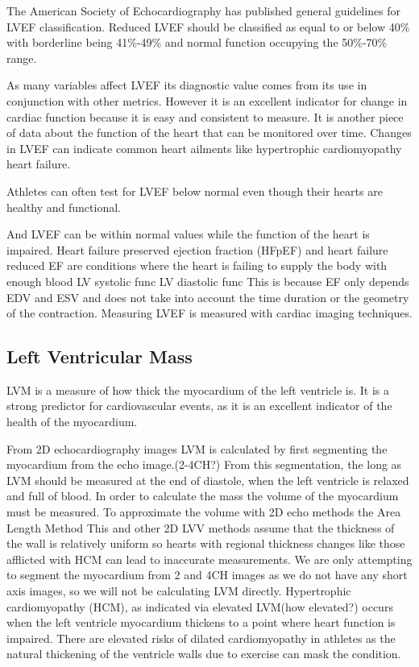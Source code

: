 \documentclass[12pt]{article}
\begin{document}
The American Society of Echocardiography has published general guidelines for LVEF classification.
Reduced LVEF should be classified as equal to or below 40\% with
borderline being 41\%-49\%
and normal function occupying the 50\%-70\% range.\cite{}

As many variables affect LVEF its diagnostic value comes from its use in conjunction with other metrics. 
However it is an excellent indicator for change in cardiac function because it is easy and consistent to measure.
It is another piece of data about the function of the heart that can be monitored over time.
Changes in LVEF can indicate common heart ailments like hypertrophic cardiomyopathy heart failure.

Athletes can often test for LVEF below normal even though their hearts are healthy and functional\cite{ef_soa}.

And LVEF can be within normal values while the function of the heart is impaired.
Heart failure preserved ejection fraction (HFpEF) and heart failure reduced EF are conditions where the heart is failing to supply the body with enough blood
LV systolic func
LV diastolic func
This is because EF only depends EDV and ESV and does not take into account the time duration or the geometry of the contraction.
Measuring LVEF is measured with cardiac imaging techniques. 
 \cite{understanding-echo}
%

\subsection{Left Ventricular Mass}
LVM is a measure of how thick the myocardium of the left ventricle is.
It is a strong predictor for cardiovascular events\cite{cardiac_chamber_quant_update}, as it is an excellent indicator of the health of the myocardium.

From 2D echocardiography images LVM is calculated by first segmenting the myocardium from the echo image.(2-4CH?)
From this segmentation, the long as
LVM should be measured at the end of diastole, when the left ventricle is relaxed and full of blood.
In order to calculate the mass the volume of the myocardium must be measured.
To approximate the volume with 2D echo methods the 
Area Length Method
This and other 2D LVV methods assume that the thickness of the wall is relatively uniform so hearts with regional thickness changes like those afflicted with HCM can lead to inaccurate measurements.
We are only attempting to segment the myocardium from 2 and 4CH images as we do not have any short axis images, so we will not be calculating LVM directly. 
Hypertrophic cardiomyopathy (HCM), as indicated via elevated LVM(how elevated?) occurs when the left ventricle myocardium thickens to a point where heart function is impaired.
There are elevated risks of dilated cardiomyopathy in athletes as the natural thickening of the ventricle walls due to exercise can mask the condition.
\end{document}
